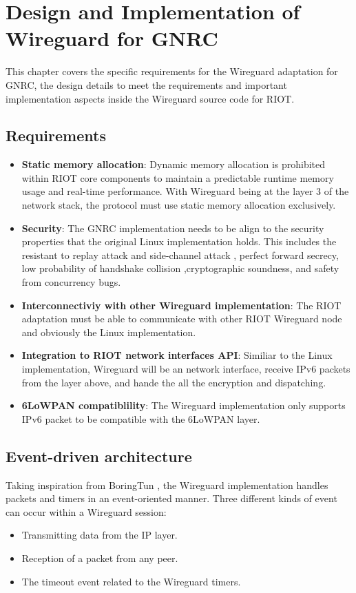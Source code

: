 \chapter{Design and Implementation of Wireguard for GNRC}
This chapter covers the specific requirements for the Wireguard adaptation for GNRC, the design 
details to meet the requirements and important implementation aspects inside the Wireguard source
code for RIOT.
\section{Requirements}
  \begin{itemize}
    \item \textbf{Static memory allocation}: Dynamic memory allocation is prohibited within RIOT core 
    components to maintain a predictable runtime memory usage and real-time performance. With
    Wireguard being at the layer 3 of the network stack, the protocol must use static memory
    allocation exclusively.
    \item \textbf{Security}: The GNRC implementation needs to be align to the security properties that
    the original Linux implementation holds. This includes the resistant to replay attack and
    side-channel attack \cite{side}, perfect forward secrecy, low probability of handshake collision \cite{pwu}
    ,cryptographic soundness, and safety from concurrency bugs.
    \item \textbf{Interconnectiviy with other Wireguard implementation}: The RIOT adaptation must 
    be able to communicate with other RIOT Wireguard node and obviously the Linux implementation.
    \item \textbf{Integration to RIOT network interfaces API}: Similiar to the Linux implementation,
    Wireguard will be an network interface, receive IPv6 packets from the layer above, and
    hande the all the encryption and dispatching.
    \item \textbf{6LoWPAN compatiblility}: The Wireguard implementation only supports IPv6 packet
    to be compatible with the 6LoWPAN layer.
  \end{itemize}
\section{Event-driven architecture}
  Taking inspiration from BoringTun \cite{boringtun}, the Wireguard implementation handles
  packets and timers in an event-oriented manner. Three different kinds of event can occur within
  a Wireguard session:
  \begin{itemize}
    \item Transmitting data from the IP layer.
    \item Reception of a packet from any peer.
    \item The timeout event related to the Wireguard timers.
  \end{itemize}

